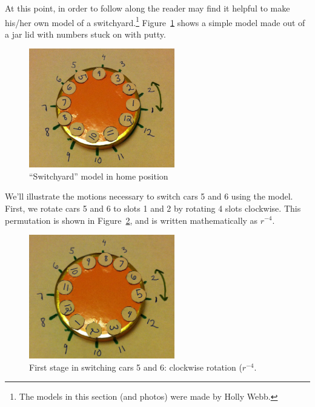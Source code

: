 At this point, in order to follow along the reader may find it helpful to make his/her own model of a switchyard.\footnote{The models in this section (and photos) were made by Holly Webb.} Figure~\ref{fig:switchyardHome} shows a simple model made out of a jar lid with numbers stuck on with putty.
\begin{figure}[ht]
\begin{center}
\includegraphics[width=2.5in]{images/switchyardHomeposition.jpg}
\caption{``Switchyard'' model in home position}\label{fig:switchyardHome}
\end{center}
\end{figure} 
We'll illustrate the motions necessary to switch cars  5 and 6  using the model.  First, we rotate cars 5 and 6 to slots 1 and 2 by rotating 4 slots clockwise. This permutation is shown in Figure~\ref{fig:switchyardCl4}, and is written mathematically as $r^{-4}$.
\begin{figure}[ht]
\begin{center}
\includegraphics[width=2.5in]{images/switchyardCl4.jpg}
\caption{First stage in switching cars 5 and 6: clockwise rotation ($r^{-4}$.}\label{fig:switchyardCl4}
\end{center}
\end{figure} 

